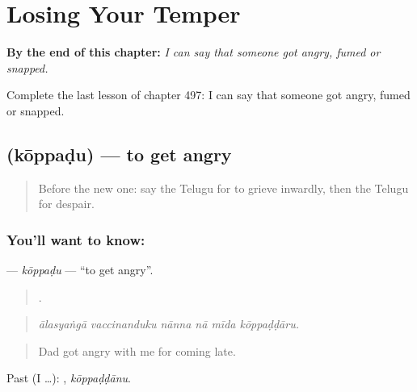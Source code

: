 
\chapter{Losing Your Temper}
\label{ch:te-losing-your-temper}

\begin{chapteropening}
\textbf{By the end of this chapter:} \emph{I can say that someone got angry, fumed or snapped.}

Complete the last lesson of chapter 497: I can say that someone got angry, fumed or snapped.
\end{chapteropening}

\section[\texorpdfstring{\te{కోప్పడు} (kōppaḍu)}{కోప్పడు (kōppaḍu)}]{ (kōppaḍu) — to get angry}

\label{lesson:TE-C497-koppadu}



\begin{quote}
Before the new one: say the Telugu for to grieve inwardly, then the Telugu for despair.
\end{quote}

\subsection*{You'll want to know: }
\textbf{} — \emph{kōppaḍu} — \textquotedblleft{}to get angry\textquotedblright{}.

\begin{quote}
     .
\end{quote}

\begin{quote}
\emph{ālasyaṅgā vaccinanduku nānna nā mīda kōppaḍḍāru.}
\end{quote}

\begin{quote}
Dad got angry with me for coming late.
\end{quote}

Past (I …): , \emph{kōppaḍḍānu}.


